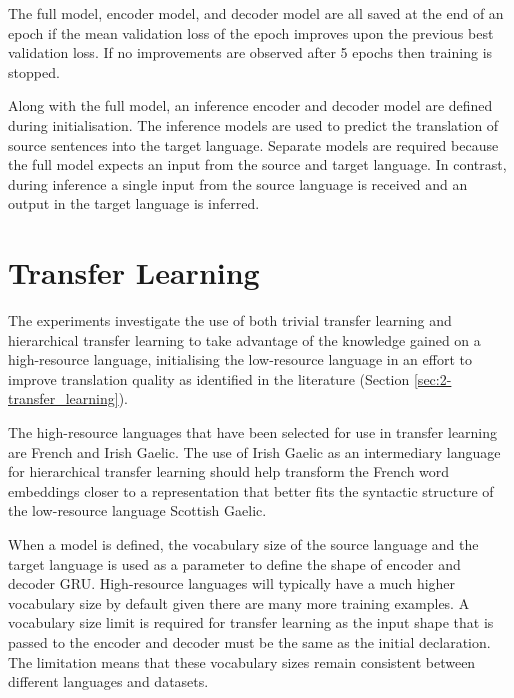 The full model, encoder model, and decoder model are all saved at the end of an epoch if the mean validation loss of the epoch improves upon the previous best validation loss. If no improvements are observed after 5 epochs then training is stopped.


Along with the full model, an inference encoder and decoder model are defined during initialisation. The inference models are used to predict the translation of source sentences into the target language. Separate models are required because the full model expects an input from the source and target language. In contrast, during inference a single input from the source language is received and an output in the target language is inferred.

\section{Transfer Learning}
\label{sec:3-transfer_learning}

The experiments investigate the use of both trivial transfer learning and hierarchical transfer learning to take advantage of the knowledge gained on a high-resource language, initialising the low-resource language in an effort to improve translation quality as identified in the literature (Section \ref{sec:2-transfer_learning}).

The high-resource languages that have been selected for use in transfer learning are French and Irish Gaelic. The use of Irish Gaelic as an intermediary language for hierarchical transfer learning should help transform the French word embeddings closer to a representation that better fits the syntactic structure of the low-resource language Scottish Gaelic.

When a model is defined, the vocabulary size of the source language and the target language is used as a parameter to define the shape of encoder and decoder \acrshort{GRU}. High-resource languages will typically have a much higher vocabulary size by default given there are many more training examples. A vocabulary size limit is required for transfer learning as the input shape that is passed to the encoder and decoder must be the same as the initial declaration. The limitation means that these vocabulary sizes remain consistent between different languages and datasets.

